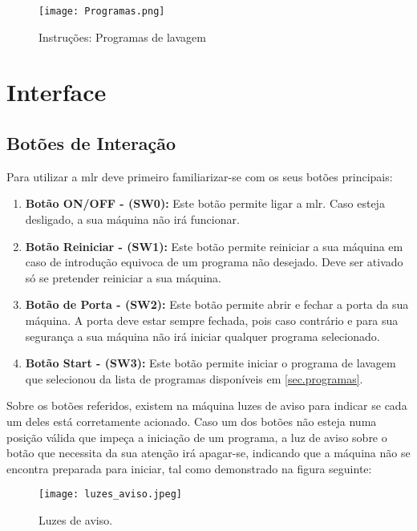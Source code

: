 \begin{figure}[H]
	\centering
	\texttt{[image: Programas.png]}
	\caption{Instruções: Programas de lavagem}
	\label{fig:programas}
\end{figure}


\section{Interface}
\label{sec.interface}

\subsection{Botões de Interação}
\label{sec.botões}

Para utilizar a \acf{mlr} deve primeiro familiarizar-se com os seus botões principais:

\begin{enumerate}
	\item\textbf{Botão ON/OFF - (SW0):} Este botão permite ligar a \ac{mlr}. Caso esteja desligado, a sua máquina não irá funcionar.
	\item\textbf{Botão Reiniciar - (SW1):} Este botão permite reiniciar a sua máquina em caso de introdução equivoca de um programa não desejado. Deve ser ativado só se pretender reiniciar a sua máquina.
	\item\textbf{Botão de Porta - (SW2):} Este botão permite abrir e fechar a porta da sua máquina. A porta deve estar sempre fechada, pois caso contrário e para sua segurança a sua máquina não irá iniciar qualquer programa selecionado.	
	\item\textbf{Botão Start - (SW3):} Este botão permite iniciar o programa de lavagem que selecionou da lista de programas disponíveis em \autoref{sec.programas}. 
	
\end{enumerate}
		
Sobre os botões referidos, existem na máquina luzes de aviso para indicar se cada um deles está  corretamente acionado. Caso um dos botões não esteja numa posição válida que impeça a iniciação de um programa, a luz de aviso sobre o botão que necessita da sua atenção irá apagar-se, indicando que a máquina não se encontra preparada para iniciar, tal como demonstrado na figura seguinte:

\begin{figure}[H]
	\centering
	\texttt{[image: luzes\_aviso.jpeg]}
	\caption{Luzes de aviso.}
	\label{fig:botoes_sistema}
\end{figure}


